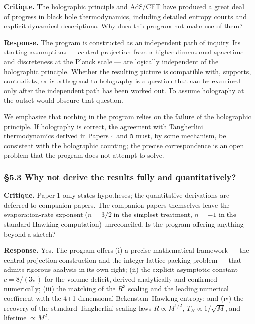 \documentclass[a4paper,11pt]{article}
\theoremstyle{definition}
\begin{document}
\textbf{Critique.} The holographic principle and AdS/CFT have produced a
great deal of progress in black hole thermodynamics, including detailed
entropy counts and explicit dynamical descriptions. Why does this
program not make use of them?

\textbf{Response.} The program is constructed as an independent path of
inquiry. Its starting assumptions --- central projection from a
higher-dimensional spacetime and discreteness at the Planck scale ---
are logically independent of the holographic principle. Whether the
resulting picture is compatible with, supports, contradicts, or is
orthogonal to holography is a question that can be examined only after
the independent path has been worked out. To assume holography at the
outset would obscure that question.

We emphasize that nothing in the program relies on the failure of the
holographic principle. If holography is correct, the agreement with
Tangherlini thermodynamics derived in Papers 4 and 5 must, by some
mechanism, be consistent with the holographic counting; the precise
correspondence is an open problem that the program does not attempt to
solve.

\subsubsection{§5.3 Why not derive the results fully and
quantitatively?}\label{why-not-derive-the-results-fully-and-quantitatively}

\textbf{Critique.} Paper 1 only states hypotheses; the quantitative
derivations are deferred to companion papers. The companion papers
themselves leave the evaporation-rate exponent (\(n = 3/2\) in the
simplest treatment, \(n = -1\) in the standard Hawking computation)
unreconciled. Is the program offering anything beyond a sketch?

\textbf{Response.} Yes. The program offers (i) a precise mathematical
framework --- the central projection construction and the
integer-lattice packing problem --- that admits rigorous analysis in its
own right; (ii) the explicit asymptotic constant \(c = 8/(3\pi)\) for
the volume deficit, derived analytically and confirmed numerically;
(iii) the matching of the \(R^3\) scaling and the leading numerical
coefficient with the 4+1-dimensional Bekenstein--Hawking entropy; and
(iv) the recovery of the standard Tangherlini scaling laws
\(R \propto M^{1/2}\), \(T_H \propto 1/\sqrt{M}\), and lifetime
\(\propto M^2\).
\end{document}
